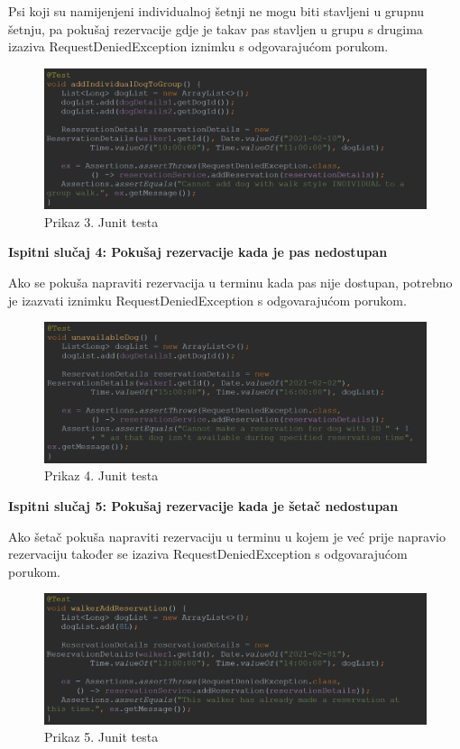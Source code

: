 			Psi koji su namijenjeni individualnoj šetnji ne mogu biti stavljeni u grupnu šetnju, pa pokušaj rezervacije gdje je takav pas stavljen u grupu s drugima izaziva RequestDeniedException iznimku s odgovarajućom porukom.
			
			\begin{figure}[H]
				\includegraphics[scale=0.6]{slike/junit-3.PNG}
				\centering
				\caption{Prikaz 3. Junit testa}
				\label{fig:testiranje}
			\end{figure}
			
			\noindent \textbf{Ispitni slučaj 4: Pokušaj rezervacije kada je pas nedostupan}
			
			Ako se pokuša napraviti rezervacija u terminu kada pas nije dostupan, potrebno je izazvati iznimku RequestDeniedException s odgovarajućom porukom.
			
			\begin{figure}[H]
				\includegraphics[scale=0.6]{slike/junit-4.PNG}
				\centering
				\caption{Prikaz 4. Junit testa}
				\label{fig:testiranje}
			\end{figure}
			
			\noindent \textbf{Ispitni slučaj 5: Pokušaj rezervacije kada je šetač nedostupan}
			
    		Ako šetač pokuša napraviti rezervaciju u terminu u kojem je već prije napravio rezervaciju također se izaziva RequestDeniedException s odgovarajućom porukom. 
			
			\begin{figure}[H]
				\includegraphics[scale=0.6]{slike/junit-5.PNG}
				\centering
				\caption{Prikaz 5. Junit testa}
				\label{fig:testiranje}
			\end{figure}
			
